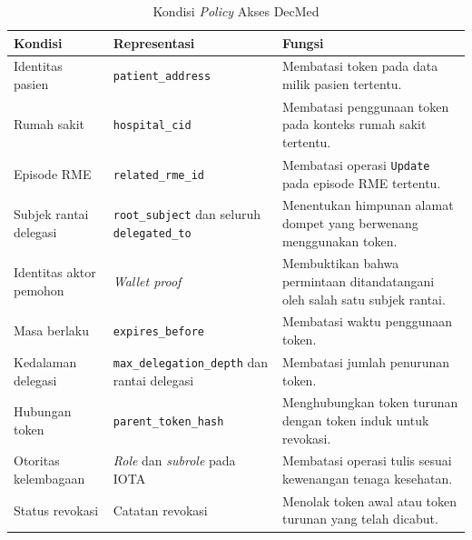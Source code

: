 \documentclass[bahasa, 12pt, a4paper, onecolumn, oneside, final]{report}
\begin{document}
\begin{table}[!ht]
	\centering
	\caption{Kondisi \textit{Policy} Akses DecMed}
	\label{tab:pemetaan-kondisi-policy-decmed}
	\small
	\begin{tabular}{|p{}|p{}|p{}|}
		\hline
		\textbf{Kondisi}
		 & \textbf{Representasi}
		 & \textbf{Fungsi}                                                            \\ \hline

		Identitas pasien
		 & \texttt{patient\_address}
		 & Membatasi token pada data milik pasien tertentu.                           \\ \hline

		Rumah sakit
		 & \texttt{hospital\_cid}
		 & Membatasi penggunaan token pada konteks rumah sakit tertentu.              \\ \hline

		Episode RME
		 & \texttt{related\_rme\_id}
		 & Membatasi operasi \texttt{Update} pada episode RME tertentu.               \\ \hline

		Subjek rantai delegasi
		 & \texttt{root\_subject} dan seluruh \texttt{delegated\_to}
		 & Menentukan himpunan alamat dompet yang berwenang menggunakan token.        \\ \hline

		Identitas aktor pemohon
		 & \textit{Wallet proof}
		 & Membuktikan bahwa permintaan ditandatangani oleh salah satu subjek rantai. \\ \hline

		Masa berlaku
		 & \texttt{expires\_before}
		 & Membatasi waktu penggunaan token.                                          \\ \hline

		Kedalaman delegasi
		 & \texttt{max\_delegation\_depth} dan rantai delegasi
		 & Membatasi jumlah penurunan token.                                          \\ \hline

		Hubungan token
		 & \texttt{parent\_token\_hash}
		 & Menghubungkan token turunan dengan token induk untuk revokasi.             \\ \hline

		Otoritas kelembagaan
		 & \textit{Role} dan \textit{subrole} pada IOTA
		 & Membatasi operasi tulis sesuai kewenangan tenaga kesehatan.                \\ \hline

		Status revokasi
		 & Catatan revokasi
		 & Menolak token awal atau token turunan yang telah dicabut.                  \\ \hline
	\end{tabular}

\end{table}
\end{document}
